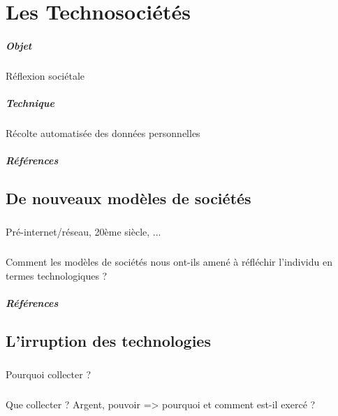 \chapter{Les Technosociétés}
\paragraph{Objet} Réflexion sociétale
\paragraph{Technique} Récolte automatisée des données personnelles
\paragraph{Références}
\cite{Damasio:0}
\cite{Damasio:1}
\cite{Deleuze:0}
\cite{Foucault:0}
\cite{Huxley:0}
\cite{Klein:0}
\cite{Marx:0}
\cite{Marx:1}
\cite{Moore:0}
\cite{Negri:0}
\cite{Nietzsche:0}
\cite{Orwell:0}
\cite{Pieces:0}
\cite{Rabhi:0}
\cite{GhostInTheShell}
\cite{Gunnm}
\cite{PsychoPass}

\section{De nouveaux modèles de sociétés}
\paragraph{} Pré-internet/réseau, 20ème siècle, ...
\paragraph{} Comment les modèles de sociétés nous ont-ils amené à réfléchir l'individu en termes technologiques ?
\paragraph{Références} \cite{Marx:0} \cite{Marx:1} \cite{Nietzsche:0}

\section{L'irruption des technologies}
\paragraph{} Pourquoi collecter ?
\paragraph{} Que collecter ? Argent, pouvoir => pourquoi et comment est-il exercé ? 
